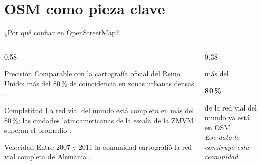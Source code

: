 \section{OSM como pieza clave}
\begin{frame}{¿Por qué confiar en OpenStreetMap?}
  \begin{columns}[c]
    \begin{column}{0.58\textwidth}
      \begin{exampleblock}{\footnotesize Precisión}
        \scriptsize Comparable con la cartografía oficial del Reino Unido: más del 80\,\%
        de coincidencia en zonas urbanas densas \citep{haklay2010good}.
      \end{exampleblock}
      \begin{block}{\footnotesize Completitud}
        \scriptsize La red vial del mundo está completa en más del 80\,\%; las ciudades
        latinoamericanas de la escala de la ZMVM superan el promedio
        \citep{barrington2017world}.
      \end{block}
      \begin{alertblock}{\footnotesize Velocidad}
        \scriptsize Entre 2007 y 2011 la comunidad cartografió la red vial completa de
        Alemania \citep{neis2012street}.
      \end{alertblock}
    \end{column}
    \begin{column}{0.38\textwidth}
      \centering
      {\small más del\par}
      {\fontsize{40}{44}\selectfont\bfseries\color{SotmVerde} 80\,\%\par}
      \vspace{0.2cm}
      {\small de la red vial del mundo ya está en OSM}\\[0.5cm]
      {\footnotesize\itshape\color{SotmTerracota} Ese dato lo construyó esta comunidad.}
    \end{column}
  \end{columns}
\end{frame}

